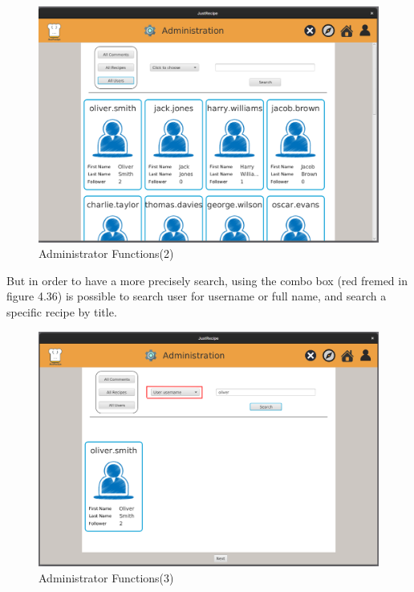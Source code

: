 \documentclass[a4paper]{report}
\begin{document}
\begin{figure}[htpb]
	\centering
	\includegraphics[scale=0.37]{img/user_manual/administratorFunction2.png}
	\caption{Administrator Functions(2)}
\end{figure}

\noindent But in order to have a more precisely search, using the combo box (red fremed in figure 4.36) is possible to search user for username or full name, and search a specific recipe by title.
\begin{figure}[htpb]
	\centering
	\includegraphics[scale=0.37]{img/user_manual/administratorFunction3.png}
	\caption{Administrator Functions(3)}
\end{figure}
\end{document}
